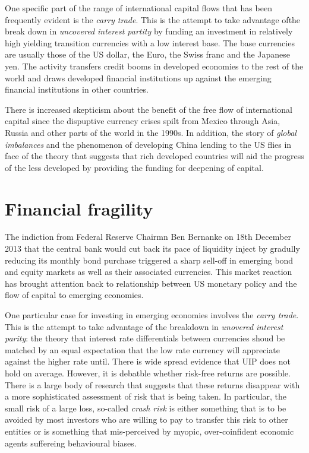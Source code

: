 \documentclass[12pt, a4paper, oneside]{article} %
\begin{document}
One specific part of the range of international capital flows that has been frequently evident is the \emph{carry trade}.  This is the attempt to take advantage ofthe break down in \emph{uncovered interest partity} by funding an investment in relatively high yielding transition currencies with a low interest base.  The base currencies are usually those of the US dollar, the Euro, the Swiss franc and the Japanese yen.  The activity transfers credit booms in developed economies to the rest of the world and draws developed financial institutions up against the emerging financial institutions in other countries.  

There is increased skepticism about the benefit of the free flow of international capital since the dispuptive currency crises spilt from Mexico through Asia, Russia and other parts of the world in the 1990s.  In addition, the story of \emph{global imbalances} and the phenomenon of developing China lending to the US flies in face of the theory that suggests that rich developed countries will aid the progress of the less developed by providing the funding for deepening of capital.  

\section{Financial fragility}
The indiction from Federal Reserve Chairmn Ben Bernanke on 18th December 2013 that the central bank would cut back its pace of liquidity inject by gradully reducing its monthly bond purchase triggered a sharp sell-off in emerging bond and equity markets as well as their associated currencies.  This market reaction has brought attention back to relationship between US monetary policy and the flow of capital to emerging economies.  

One particular case for investing in emerging economies involves the \emph{carry trade}.  This is the attempt to take advantage of the breakdown in \emph{unovered interest parity}: the theory that interest rate differentials between currencies shoud be matched by an equal expectation that the low rate currency will appreciate against the higher rate until.  There is wide spread evidence that UIP does not hold on average.  However, it is debatble whether risk-free returns are possible.  There is a large body of research that suggests that these returns disappear with a more sophisticated assessment of risk that is being taken.  In particular, the small risk of a large loss, so-called \emph{crash risk} is either something that is to be avoided by most investors who are willing to pay to transfer this risk to other entities or is something that mis-perceived by myopic, over-coinfident economic agents suffereing behavioural biases.  
\end{document}
